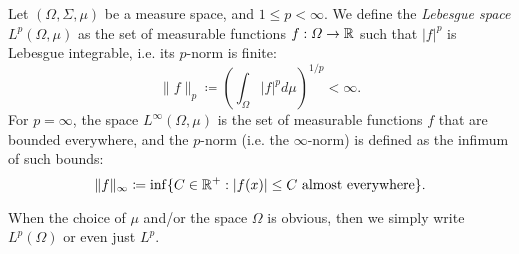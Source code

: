 \begin{definition}
    Let $(\Omega, \Sigma, \mu)$ be a measure space, and $1\leq p<\infty$. We define the \emph{Lebesgue space} $L^p(\Omega,\mu)$ as the set of measurable functions $f:\Omega\to \mathbb{R}$ such that $|f|^p$ is Lebesgue integrable, i.e. its $p$-norm is finite:
    \begin{equation*}
        \|f\|_p \coloneqq \left(\int_\Omega |f|^p d\mu\right)^{1/p} < \infty.
    \end{equation*}
    For $p=\infty$, the space $L^\infty(\Omega,\mu)$ is the set of measurable functions $f$ that are bounded everywhere, and the $p$-norm (i.e. the $\infty$-norm) is defined as the infimum of such bounds: 
    \begin{equation*}
        \|f\|_\infty \coloneqq \inf\{C\in\mathbb{R}^+: |f(x)|\leq C \text{ almost everywhere}\}.
    \end{equation*}

    When the choice of $\mu$ and/or the space $\Omega$ is obvious, then we simply write $L^p(\Omega)$ or even just $L^p$.
\end{definition}

